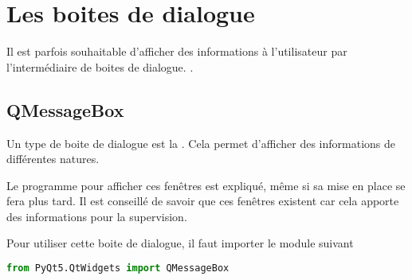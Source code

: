 \documentclass[12pt]{report}    %
\begin{document}
\section{Les boites de dialogue}

Il est parfois souhaitable d'afficher des informations à l'utilisateur par l'intermédiaire de boites de dialogue. \newline.

\subsection{QMessageBox}

Un type de boite de dialogue est la . Cela permet d'afficher des informations de différentes natures.\newline

Le programme pour afficher ces fenêtres est expliqué, même si sa mise en place se fera plus tard. \newlineIl
Il est conseillé de savoir que ces fenêtres existent car cela apporte des informations pour la supervision.\newline

Pour utiliser cette boite de dialogue, il faut importer le module suivant
\begin{lstlisting}[language=Python]
from PyQt5.QtWidgets import QMessageBox
\end{lstlisting}
\end{document}
